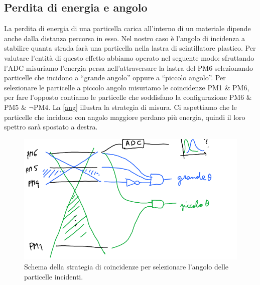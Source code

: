 \subsection{Perdita di energia e angolo}   %

La perdita di energia di una particella carica all'interno di un materiale dipende anche dalla distanza percorsa in esso.
Nel nostro caso è l'angolo di incidenza a stabilire quanta strada farà una particella nella lastra di scintillatore plastico. Per valutare l'entità di questo effetto abbiamo operato nel seguente modo: sfruttando l'ADC misuriamo l'energia persa nell'attraversare la lastra del PM6 selezionando particelle che incidono a ``grande angolo'' oppure a ``piccolo angolo''.
Per selezionare le particelle a piccolo angolo misuriamo le coincidenze PM1 \& PM6, per fare l'opposto contiamo le particelle che soddisfano la configurazione PM6 \& PM5 \& $\neg$PM4.
La \autoref{ang} illustra la strategia di misura. Ci aspettiamo che le particelle che incidono con angolo maggiore perdano più energia, quindi il loro spettro sarà spostato a destra.

\begin{figure}
\centering
\includegraphics[width=8 cm]{ang}
\caption{Schema della strategia di coincidenze per selezionare l'angolo delle particelle incidenti.}
\label{ang}
\end{figure}

